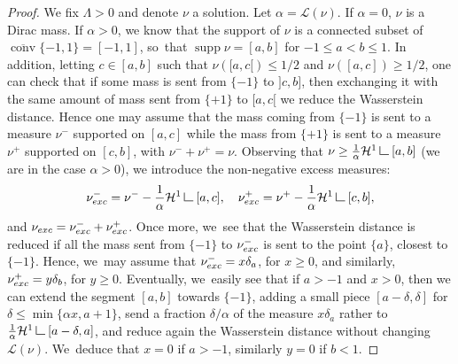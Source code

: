 \documentclass[11pt]{article}
\numberwithin{equation}{section}
\theoremstyle{definition}
\newcommand\LM[1]{\hbox{\vrule width.5pt \vbox to#1pt{\vfill \hrule width#1pt height.5pt}}}
\newcommand\LL{{\mathchoice {\>\LM7\>}{\>\LM7\>}{\,\LM5\,}{\,\LM{3.35}\,}}}
\newcommand{\mres}{\LL}
\newcommand\cH{\mathcal{H}}
\newcommand\cL{\mathcal{L}}
\DeclareMathOperator{\supp}{supp}
\DeclareMathOperator{\conv}{conv}
\newcommand{\cconv}{\overline{\conv}}
\newcommand{\nuexc}{\nu_{\textup{exc}}}
\newcommand{\ci}[2]{ \left[ #1, #2 \right] }
\begin{document}
\begin{proof}
We fix $\Lambda>0$ and denote $\nu$ a solution.
Let $\alpha=\mathcal{L}(\nu)$.
If $\alpha=0$, $\nu$ is a Dirac mass. If $\alpha>0$,
we know that the support of $\nu$ is a connected subset of
$\cconv{\{-1,1\}}=[-1,1]$, so~that $\supp\nu = [a,b]$ for $-1\le a < b\le 1$.
In addition, letting $c\in [a,b]$ such that
$\nu([a,c[)\le 1/2$ and $\nu([a,c])\ge 1/2$, one can check that
if some mass is sent from $\{-1\}$ to $]c,b]$, then exchanging it
with the same amount of mass sent from $\{+1\}$ to $[a,c[$ we reduce
the Wasserstein distance. Hence one may assume that the mass
coming from $\{-1\}$ is sent to a measure $\nu^-$ supported on $[a,c]$
while the mass from $\{+1\}$ is sent to a measure $\nu^+$ supported
on $[c,b]$, with $\nu^-+\nu^+=\nu$. Observing that $\nu\ge \frac{1}{\alpha}\cH^1\mres [a,b]$
(we are in the case $\alpha>0$),
we introduce the non-negative excess measures:
\[
\nuexc^- = \nu^- - \frac{1}{\alpha}\cH^1\mres [a,c],\quad
\nuexc^+ = \nu^+ - \frac{1}{\alpha}\cH^1\mres [c,b],
\]
and $\nuexc = \nuexc^-+\nuexc^+$. Once more, we~see that the Wasserstein
distance is reduced if all the mass sent from $\{-1\}$ to $\nuexc^-$
is sent to the point $\{a\}$, closest to $\{-1\}$. Hence, we~may assume
that $\nuexc^-= x\delta_a$, for $x\ge 0$, and similarly,
$\nuexc^+ = y\delta_b$, for $y\ge 0$. Eventually, we~easily see that
if $a>-1$ and $x>0$, then we can extend the segment $[a,b]$ towards $\{-1\}$,
adding a small piece $[a-\delta,\delta]$ for $\delta\le
\min \{\alpha x, a+1\}$, send a fraction $\delta/\alpha$ of
the measure $x\delta_{a}$ rather to $\frac{1}{\alpha}\cH^1\mres [a-\delta,a]$,
and reduce again the Wasserstein distance without changing $\mathcal{L}(\nu)$. We~deduce that $x=0$ if $a>-1$, similarly $y=0$ if $b<1$.

\newcommand{\noop}[1]{}
\noop{
Since the solutions are supported on a line segment in $\ci{-1}{1}$, they are of the form $\nu=\delta_{a}$ or
$ \nu = \frac{1}{\alpha}\cH^1\mres\ci{a}{b}+\nuexc$,
with $\alpha=\cL(\nu)$ and $\supp \nuexc \subset \ci{a}{b}\subset \ci{-1}{1}$.

Since solutions are supported on a line segment in $\ci{-1}{1}$, we~use the ansatz and assume them to be of the form
\[
\nu = \frac{1}{\alpha}\cH^1\mres\ci{a}{b}
\text{ or }
\nu = \frac{1}{\alpha}\cH^1\mres\ci{-1}{1} + c\delta_{-1} +d\delta_1.
\]
Indeed if the $[a,b]$ does not coincide with $[-1,1]$ and there is any mass left after we form the uniform measure over the segment $[a,b]$, we~enlarge a bit the segment. If $a$ or $b$ coincide with $-1,1$, we~can just leave any residual mass concentrated at the Dirac delta with no transportation cost, see for instance Lemma~\ref{lemma.minimal_distance2Sigma} below.}


\end{proof}
\end{document}
